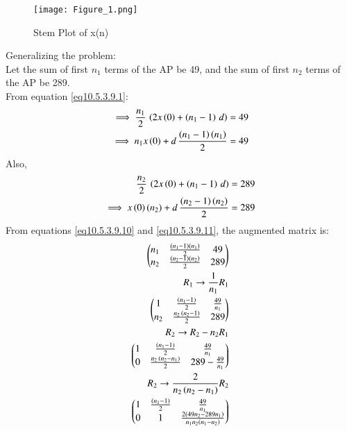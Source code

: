 \documentclass[journal,12pt,twocolumn]{IEEEtran}
\theoremstyle{remark}
\begin{document}
\begin{figure}[h]
    \centering
    \texttt{[image: Figure\_1.png]}
    \caption{Stem Plot of x(n)}
    \label{stemplot}
\end{figure}
Generalizing the problem:\\
Let the sum of first $n_1$ terms of the AP be 49, and the sum of first $n_2$ terms of the AP be 289.\\
From equation \ref{eq10.5.3.9.1}:
\begin{align}
\implies \frac{n_1}{2}\,\left(2x\left(0\right)+\left(n_1-1\right)\,d\right)&=49\\
\implies n_1x\left(0\right)+ d\,\frac{\left(n_1-1\right)\left(n_1\right)}{2}&=49\label{eq10.5.3.9.10}
\end{align}
Also,
\begin{align}
\frac{n_2}{2}\,\left(2x\left(0\right)+\left(n_1-1\right)\,d\right)&=289\\
\implies x\left(0\right)\left(n_2\right)+ d\,\frac{\left(n_2-1\right)\left(n_2\right)}{2}&=289\label{eq10.5.3.9.11}
\end{align}
From  equations \ref{eq10.5.3.9.10} and \ref{eq10.5.3.9.11}, the augmented matrix is:
\begin{align}
    \begin{pmatrix}
        n_1&\frac{\left(n_1-1\right)\left(n_1\right)}{2}&49\\
        n_2&\frac{\left(n_2-1\right)\left(n_2\right)}{2}&289
    \end{pmatrix}
    \\R_1\rightarrow\frac{1}{n_1}R_1\notag\\
    \begin{pmatrix}
        1&\frac{\left(n_1-1\right)}{2}&\frac{49}{n_1}\\
        n_2&\frac{n_2\,\left(n_2-1\right)}{2}&289
    \end{pmatrix}\\
    R_2 \rightarrow R_2-n_2R_1\notag\\
    \begin{pmatrix}
        1&\frac{\left(n_1-1\right)}{2}&\frac{49}{n_1}\\
        0&\frac{n_2\,\left(n_2-n_1\right)}{2}&289-\frac{49}{n_1}
    \end{pmatrix}\\
    R_2\rightarrow\frac{2}{n_2\left(n_2-n_1\right)}R_2\notag\\
    \begin{pmatrix}
        1&\frac{\left(n_1-1\right)}{2}&\frac{49}{n_1}\\
        0&1&\frac{2\left(49n_2-289 n_1\right)}{n_1 n_2\left(n_1-n_2\right)}
    \end{pmatrix}
\end{align}
\end{document}
